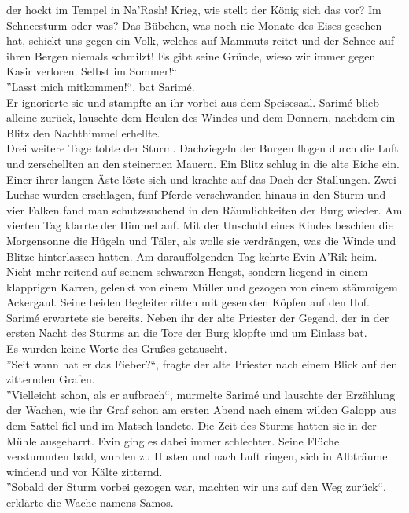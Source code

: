 der hockt im Tempel in Na'Rash! Krieg, wie stellt der König sich das vor? Im Schneesturm oder was? 
Das Bübchen, was noch nie Monate des Eises gesehen hat, schickt uns gegen ein Volk, welches auf 
Mammuts reitet und der Schnee auf ihren Bergen niemals schmilzt! Es gibt seine Gründe, wieso wir
immer gegen Kasir verloren. Selbst im Sommer!``\\
''Lasst mich mitkommen!``, bat Sarimé.\\
Er ignorierte sie und stampfte an ihr vorbei aus dem Speisesaal. Sarimé blieb alleine zurück, 
lauschte dem Heulen des Windes und dem Donnern, nachdem ein Blitz den Nachthimmel erhellte.\\


Drei weitere Tage tobte der Sturm. Dachziegeln der Burgen flogen durch die Luft und zerschellten an 
den steinernen Mauern. Ein Blitz schlug in die alte Eiche ein. Einer ihrer langen Äste löste sich 
und krachte auf das Dach der Stallungen. Zwei Luchse wurden erschlagen, fünf Pferde verschwanden 
hinaus in den Sturm und vier Falken fand man schutzssuchend in den Räumlichkeiten der Burg wieder. 
Am vierten Tag klarrte der Himmel auf. Mit der Unschuld eines Kindes beschien die Morgensonne die 
Hügeln und Täler, als wolle sie verdrängen, was die Winde und Blitze hinterlassen hatten. Am 
darauffolgenden Tag kehrte Evin A'Rik heim. Nicht mehr reitend auf seinem schwarzen Hengst, sondern 
liegend in einem klapprigen Karren, gelenkt von einem Müller und gezogen von einem stämmigem 
Ackergaul. Seine beiden Begleiter ritten mit gesenkten Köpfen auf den Hof. Sarimé erwartete sie 
bereits. Neben ihr der alte Priester der Gegend, der in der ersten Nacht des Sturms an die Tore der 
Burg klopfte und um Einlass bat.\\
Es wurden keine Worte des Grußes getauscht.\\
''Seit wann hat er das Fieber?``, fragte der alte Priester nach einem Blick auf den zitternden 
Grafen.\\
''Vielleicht schon, als er aufbrach``, murmelte Sarimé und lauschte der Erzählung der Wachen, wie 
ihr Graf schon am ersten Abend nach einem wilden Galopp aus dem Sattel fiel und im Matsch landete. 
Die Zeit des Sturms hatten sie in der Mühle ausgeharrt. Evin ging es dabei immer schlechter. 
Seine Flüche verstummten bald, wurden zu Husten und nach Luft ringen, sich in Albträume windend und 
vor Kälte zitternd.\\
''Sobald der Sturm vorbei gezogen war, machten wir uns auf den Weg zurück``, erklärte die Wache 
namens Samos.\\
